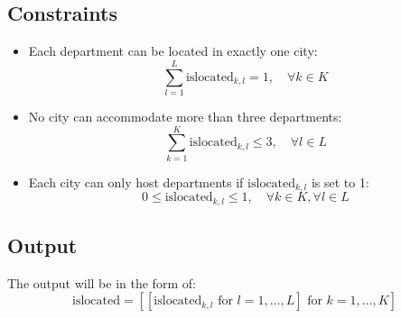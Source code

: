 \documentclass{article}
\begin{document}
\subsection*{Constraints}
\begin{itemize}
    \item Each department can be located in exactly one city:
    \[
    \sum_{l=1}^{L} \text{islocated}_{k, l} = 1, \quad \forall k \in K
    \]

    \item No city can accommodate more than three departments:
    \[
    \sum_{k=1}^{K} \text{islocated}_{k, l} \leq 3, \quad \forall l \in L
    \]

    \item Each city can only host departments if \( \text{islocated}_{k, l} \) is set to 1:
    \[
    0 \leq \text{islocated}_{k, l} \leq 1, \quad \forall k \in K, \forall l \in L
    \]
\end{itemize}

\subsection*{Output}
The output will be in the form of:
\[
\text{islocated} = \left[\left[\text{islocated}_{k, l} \text{ for } l = 1, \ldots, L\right] \text{ for } k = 1, \ldots, K\right]
\]
\end{document}
